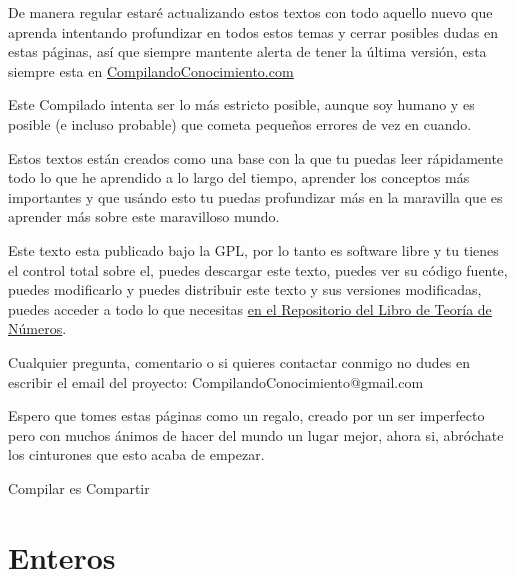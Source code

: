 \documentclass[12pt, fleqn]{report}                             %
\begin{document}
    De manera regular estaré actualizando estos textos con todo aquello nuevo que aprenda intentando
    profundizar en todos estos temas y cerrar posibles dudas en estas páginas, así que siempre mantente
    alerta de tener la última versión, esta siempre esta en \href{http://www.CompilandoConocimiento.com}
    {\underline{CompilandoConocimiento.com}} 

    Este Compilado intenta ser lo más estricto posible, aunque soy humano y es posible (e incluso probable) que
    cometa pequeños errores de vez en cuando.

    Estos textos están creados como una base con la que tu puedas leer rápidamente todo lo que he aprendido
    a lo largo del tiempo, aprender los conceptos más importantes y que usándo esto tu puedas profundizar
    más en la maravilla que es aprender más sobre este maravilloso mundo.

    Este texto esta publicado bajo la GPL, por lo tanto es software libre y tu tienes el control total sobre
    el, puedes descargar este texto, puedes ver su código fuente, puedes modificarlo y puedes distribuir este
    texto y sus versiones modificadas, puedes acceder a todo lo que necesitas 
    \href{http://www.github.com/CompilandoConocimiento/LibroTeoriaDeNumeros}
    {\underline{en el Repositorio del Libro de Teoría de Números}}. 

    Cualquier pregunta, comentario o si quieres contactar conmigo no dudes en escribir el email del proyecto:
    CompilandoConocimiento@gmail.com

    Espero que tomes estas páginas como un regalo, creado por un ser imperfecto pero con muchos ánimos de hacer
    del mundo un lugar mejor, ahora si, abróchate los cinturones que esto acaba de empezar.

    \begin{flushright}
        Compilar es Compartir
    \end{flushright}








\chapter{Enteros}
    \clearpage
\end{document}
